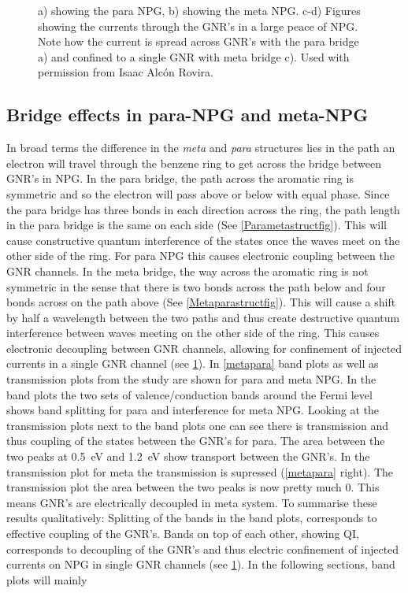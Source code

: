 \begin{figure}[h]
\begin{subfigure}[b]{.45\textwidth}
	    \caption{}
	    \label{studyfig3}
	\end{subfigure}
\caption{a) showing the para NPG, b) showing the meta NPG.\newline
c-d) Figures showing the currents through the GNR's in a large peace of NPG. Note how the current is spread across GNR's with the para bridge a) and confined to a single GNR with meta bridge c).\newline
Used with permission from Isaac Alcón Rovira.}
\label{studyfigs}
\end{figure}
\subsection{Bridge effects in para-NPG and meta-NPG}\label{metaparasection}
In broad terms the difference in the \textit{meta} and \textit{para} structures lies in the path an electron will travel through the benzene ring to get across the bridge between GNR's in NPG. In the para bridge, the path across the aromatic ring is symmetric and so the electron will pass above or below with equal phase. Since the para bridge has three bonds in each direction across the ring, the path length in the para bridge is the same on each side (See \cref{Parametastructfig}). This will cause constructive quantum interference of the states once the waves meet on the other side of the ring. For para NPG this causes electronic coupling between the GNR channels. In the meta bridge, the way across the aromatic ring is not symmetric in the sense that there is two bonds across the path below and four bonds across on the path above (See \cref{Metaparastructfig}). This will cause a shift by half a wavelength between the two paths and thus create destructive quantum interference between waves meeting on the other side of the ring. This causes electronic decoupling between GNR channels, allowing for confinement of injected currents in a single GNR channel\cite{unpub} (see \cref{studyfig3}). In \cref{metapara} band plots as well as transmission plots from the study\cite{unpub} are shown for para and meta NPG. In the band plots the two sets of valence/conduction bands around the Fermi level shows band splitting for para and interference for meta NPG. Looking at the transmission plots next to the band plots one can see there is transmission and thus coupling of the states between the GNR's for para. The area between the two peaks at \SI{0.5}{\electronvolt} and  \SI{1.2}{\electronvolt} show transport between the GNR's. In the transmission plot for meta the transmission is supressed (\cref{metapara} right). The transmission plot the area between the two peaks is now pretty much 0. This means GNR's are electrically decoupled in meta system. To summarise these results qualitatively: Splitting of the bands in the band plots, corresponds to effective coupling of the GNR's. Bands on top of each other, showing QI, corresponds to decoupling of the GNR's and thus electric confinement of injected currents on NPG in single GNR channels (see \cref{studyfig3}). In the following sections, band plots will mainly 